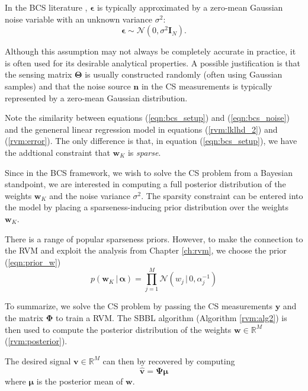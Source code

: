 In the BCS literature \cite{ji2008}, $\bm\epsilon$ is typically approximated by a zero-mean Gaussian noise variable with an unknown variance $\sigma^2$:
\begin{equation}
\label{eqn:bcs_noise}
  \bm\epsilon\sim\mathcal{N}(0,\sigma^2\bm I_N).
\end{equation}

Although this assumption may not always be completely accurate in practice, it is often used for its desirable analytical properties.
A possible justification is that the sensing matrix $\bm\Theta$ is usually constructed randomly (often using Gaussian samples) and that the noise source $\bm n$ in the CS measurements is typically represented by a zero-mean Gaussian distribution.

Note the similarity between equations (\ref{eqn:bcs_setup}) and (\ref{eqn:bcs_noise}) and the geneneral linear regression model in equations (\ref{rvm:lklhd_2}) and (\ref{rvm:error}).
The only difference is that, in equation (\ref{eqn:bcs_setup}), we have the addtional constraint that $\bm w_K$ is \emph{sparse}.

Since in the BCS framework, we wish to solve the CS problem from a Bayesian standpoint, we are interested in computing a full posterior distribution of the weights $\bm w_K$ and the noise variance $\sigma^2$.
The sparsity constraint can be entered into the model by placing a sparseness-inducing prior distribution over the weights $\bm w_K$.

There is a range of popular sparseness priors.
However, to make the connection to the RVM and exploit the analysis from Chapter \ref{ch:rvm}, we choose the prior (\ref{eqn:prior_w})
\begin{equation*}
  p(\bm w_K\,|\,\bm \alpha) = \prod_{j=1}^M \mathcal{N}\left(w_j\,|\,0,\alpha_j^{-1}\right)
\end{equation*}

To summarize, we solve the CS problem by passing the CS measurements $\bm y$ and the matrix $\bm\Phi$ to train a RVM.
The SBBL algorithm (Algorithm \ref{rvm:alg2}) is then used to compute the posterior distribution of the weights $\bm w \in \mathbb{R}^M$ (\ref{rvm:posterior}).

The desired signal $\bm v\in\mathbb{R}^M$ can then by recovered by computing 
\begin{equation}
  \label{eqn:bcs_recover}
  \bm{\hat v} = \bm\Psi\bm\mu
\end{equation} 
where $\bm \mu$ is the posterior mean of $\bm w$.

